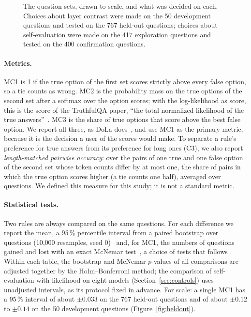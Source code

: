 \documentclass[11pt]{article}
\newcommand{\cha}[1]{\textsf{C#1}}
\begin{document}
\begin{figure}[t]
\centering

\caption{The question sets, drawn to scale, and what was decided on each. Choices about layer contrast were made on
the 50 development questions and tested on the 767 held-out questions; choices about self-evaluation were made on
the 417 exploration questions and tested on the 400 confirmation questions.}
\label{fig:sets}
\end{figure}

\paragraph{Metrics.}
MC1 is 1 if the true option of the first set scores strictly above every false option, so a tie counts as wrong.
MC2 is the probability mass on the true options of the second set after a softmax over the option scores; with the
log-likelihood as score, this is the score of the TruthfulQA paper, ``the total normalized likelihood of the true
answers''~\citep{lin2022truthfulqa}. MC3 is the share of true options that score above the best false option. We
report all three, as DoLa does~\citep{chuang2024dola}, and use MC1 as the primary metric, because it is the
decision a user of the scores would make. To separate a rule's preference for true answers from its preference for
long ones (\cha3), we also report \emph{length-matched pairwise accuracy}: over the pairs of one true and one false
option of the second set whose token counts differ by at most one, the share of pairs in which the true option
scores higher (a tie counts one half), averaged over questions. We defined this measure for this study; it is not a
standard metric.

\paragraph{Statistical tests.}
Two rules are always compared on the same questions. For each difference we report the mean, a 95\,\% percentile
interval from a paired bootstrap over questions (10,000 resamples, seed 0)~\citep{bergkirkpatrick2012empirical}
and, for MC1, the numbers of questions gained and lost with an exact McNemar test~\citep{mcnemar1947note}, a
choice of tests that follows \citet{dror2018hitchhiker}. Within each table, the bootstrap and McNemar $p$-values
of all comparisons are adjusted together by the Holm--Bonferroni method; the comparison of self-evaluation with
likelihood on eight models (Section~\ref{sec:controls}) uses unadjusted intervals, as its protocol fixed in advance.
For scale: a single MC1 has a 95\,\% interval of about $\pm 0.033$ on the 767 held-out questions and of about $\pm
0.12$ to $\pm 0.14$ on the 50 development questions (Figure~\ref{fig:heldout}).
\end{document}
